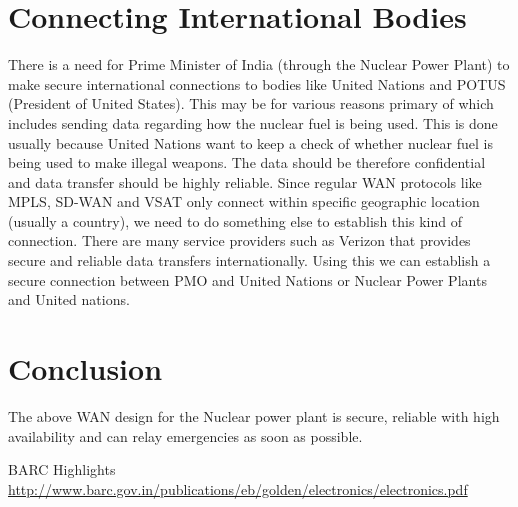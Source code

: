 \documentclass{article}
\begin{document}
\section{Connecting International Bodies}
There is a need for Prime Minister of India (through the Nuclear Power Plant) to make secure international connections to bodies like United Nations and POTUS (President of United States). This may be for various reasons primary of which includes sending data regarding how the nuclear fuel is being used. This is done usually because United Nations want to keep a check of whether nuclear fuel is being used to make illegal weapons. The data should be therefore confidential and data transfer should be highly reliable. Since regular WAN protocols like MPLS, SD-WAN and VSAT only connect within specific geographic location (usually a country), we need to do something else to establish this kind of connection. There are many service providers such as Verizon that provides secure and reliable data transfers internationally. Using this we can establish a secure connection between PMO and United Nations or Nuclear Power Plants and United nations.


\section{Conclusion}
The above WAN design for the Nuclear power plant is secure, reliable with high availability and can relay emergencies as soon as possible.


\begin{thebibliography}{bib}
     BARC Highlights\\ \url{http://www.barc.gov.in/publications/eb/golden/electronics/electronics.pdf}
\end{thebibliography}
\end{document}
